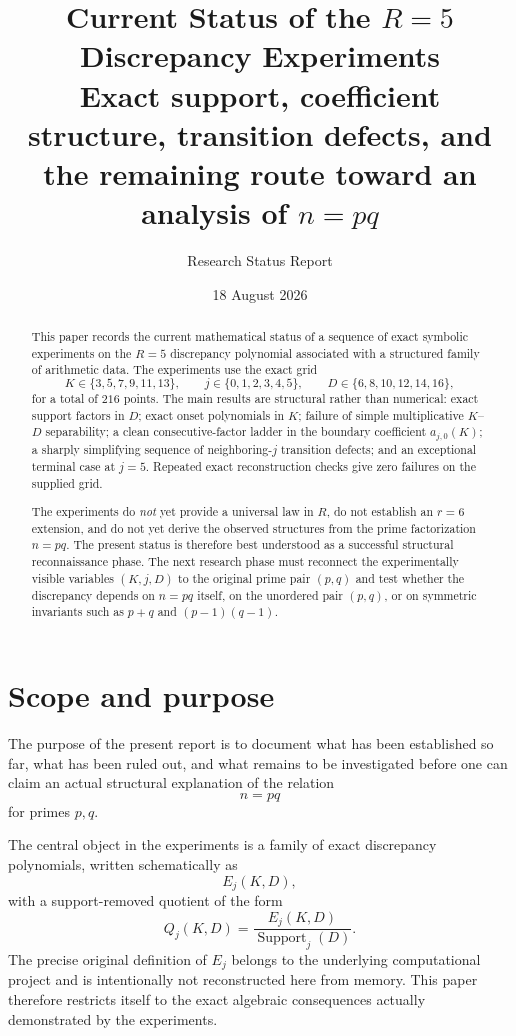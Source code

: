 \documentclass[11pt,a4paper]{article}
\title{\textbf{Current Status of the $R=5$ Discrepancy Experiments}\\
\large Exact support, coefficient structure, transition defects, and the remaining route toward an analysis of $n=pq$}
\author{Research Status Report}
\date{18 August 2026}
\begin{document}
\maketitle

\begin{abstract}
This paper records the current mathematical status of a sequence of exact symbolic experiments on the $R=5$ discrepancy polynomial associated with a structured family of arithmetic data. The experiments use the exact grid
\[
K\in\{3,5,7,9,11,13\},\qquad
j\in\{0,1,2,3,4,5\},\qquad
D\in\{6,8,10,12,14,16\},
\]
for a total of $216$ points.
The main results are structural rather than numerical: exact support factors in $D$; exact onset polynomials in $K$; failure of simple multiplicative $K$--$D$ separability; a clean consecutive-factor ladder in the boundary coefficient $a_{j,0}(K)$; a sharply simplifying sequence of neighboring-$j$ transition defects; and an exceptional terminal case at $j=5$.
Repeated exact reconstruction checks give zero failures on the supplied grid.

The experiments do \emph{not} yet provide a universal law in $R$, do not establish an $r=6$ extension, and do not yet derive the observed structures from the prime factorization $n=pq$. The present status is therefore best understood as a successful structural reconnaissance phase. The next research phase must reconnect the experimentally visible variables $(K,j,D)$ to the original prime pair $(p,q)$ and test whether the discrepancy depends on $n=pq$ itself, on the unordered pair $(p,q)$, or on symmetric invariants such as $p+q$ and $(p-1)(q-1)$.
\end{abstract}

\tableofcontents
\newpage

\section{Scope and purpose}

The purpose of the present report is to document what has been established so far, what has been ruled out, and what remains to be investigated before one can claim an actual structural explanation of the relation
\[
 n=pq
\]
for primes $p,q$.

The central object in the experiments is a family of exact discrepancy polynomials, written schematically as
\[
E_j(K,D),
\]
with a support-removed quotient of the form
\begin{equation}
Q_j(K,D)
=
\frac{E_j(K,D)}{\operatorname{Support}_j(D)}.
\label{eq:Qdef}
\end{equation}
The precise original definition of $E_j$ belongs to the underlying computational project and is intentionally not reconstructed here from memory. This paper therefore restricts itself to the exact algebraic consequences actually demonstrated by the experiments.
\end{document}
